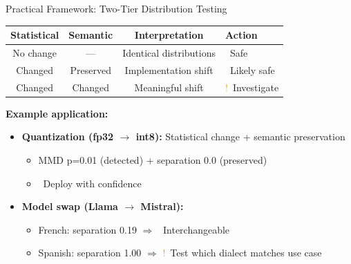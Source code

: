 \documentclass[aspectratio=169,11pt]{beamer}
\newcommand{\good}{\textcolor{darkgreen}{\ding{51}}}
\newcommand{\maybe}{\textcolor{orange}{!}}
\begin{document}
\begin{frame}{Practical Framework: Two-Tier Distribution Testing}

\begin{center}
\begin{tabular}{cccl}
\toprule
\textbf{Statistical} & \textbf{Semantic} & \textbf{Interpretation} & \textbf{Action} \\
\midrule
No change & — & Identical distributions & \good\ Safe \\
Changed & Preserved & Implementation shift & \good\ Likely safe \\
Changed & Changed & Meaningful shift & \maybe\ Investigate \\
\bottomrule
\end{tabular}
\end{center}

\vspace{1em}

\textbf{Example application:}
\begin{itemize}
  \item \textbf{Quantization (fp32 $\to$ int8):} Statistical change + semantic preservation
  \begin{itemize}
    \item MMD p=0.01 (detected) + separation 0.0 (preserved)
    \item \good\ Deploy with confidence
  \end{itemize}

  \vspace{0.5em}

  \item \textbf{Model swap (Llama $\to$ Mistral):}
  \begin{itemize}
    \item French: separation 0.19 $\Rightarrow$ \good\ Interchangeable
    \item Spanish: separation 1.00 $\Rightarrow$ \maybe\ Test which dialect matches use case
  \end{itemize}
\end{itemize}

\end{frame}
\end{document}
